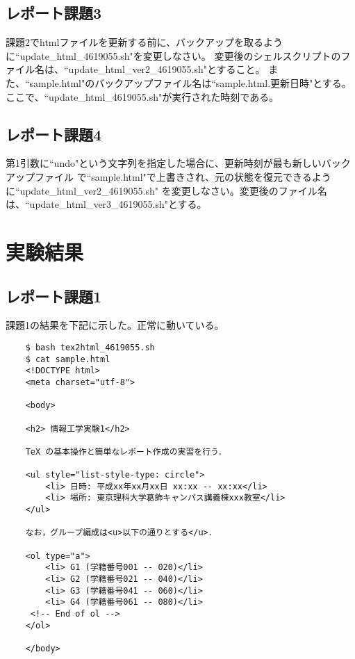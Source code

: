 \documentclass[12pt]{jarticle}
\begin{document}
\subsection{レポート課題3}
\begin{shadebox}
    課題2でhtmlファイルを更新する前に、バックアップを取るように``update\_html\_4619055.sh"を変更しなさい。
    変更後のシェルスクリプトのファイル名は、``update\_html\_ver2\_4619055.sh"とすること。
    また、``sample.html"のバックアップファイル名は``sample.html.更新日時"とする。
    ここで、``update\_html\_4619055.sh"が実行された時刻である。
\end{shadebox}

\subsection{レポート課題4}
\begin{shadebox}
    第1引数に``undo"という文字列を指定した場合に、更新時刻が最も新しいバックアップファイル
    で``sample.html"で上書きされ、元の状態を復元できるように``update\_html\_ver2\_4619055.sh"
    を変更しなさい。変更後のファイル名は、``update\_html\_ver3\_4619055.sh"とする。
\end{shadebox}

\clearpage

\section{実験結果}
\subsection{レポート課題1}
課題1の結果を下記に示した。正常に動いている。
\begin{lstlisting}
    $ bash tex2html_4619055.sh
    $ cat sample.html
    <!DOCTYPE html>
    <meta charset="utf-8">
    
    <body>
    
    <h2> 情報工学実験1</h2>
    
    TeX の基本操作と簡単なレポート作成の実習を行う．
    
    <ul style="list-style-type: circle">
        <li> 日時: 平成xx年xx月xx日 xx:xx -- xx:xx</li>
        <li> 場所: 東京理科大学葛飾キャンパス講義棟xxx教室</li>
    </ul>
    
    なお，グループ編成は<u>以下の通りとする</u>．
    
    <ol type="a">
        <li> G1 (学籍番号001 -- 020)</li>
        <li> G2 (学籍番号021 -- 040)</li>
        <li> G3 (学籍番号041 -- 060)</li>
        <li> G4 (学籍番号061 -- 080)</li>
     <!-- End of ol -->
    </ol>
    
    </body>
\end{lstlisting}
\end{document}
